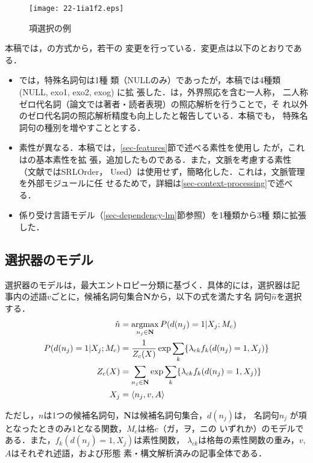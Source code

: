 \documentclass[japanese]{jnlp_1.4}
\begin{document}
\begin{figure}[b]
\begin{center}
\texttt{[image: 22-1ia1f2.eps]}
\end{center}
\caption{項選択の例}
\label{fig-struct}
\end{figure}

本稿では，の方式から，若干の
変更を行っている．変更点は以下のとおりである．

\begin{itemize}
\item {}では，特殊名詞句は1種
類（NULLのみ）であったが，本稿では4種類 (NULL, exo1, exo2, exog) に拡
張した．は，外界照応を含む一人称，
二人称ゼロ代名詞（論文では著者・読者表現）の照応解析を行うことで，そ
れ以外のゼロ代名詞の照応解析精度も向上したと報告している．本稿でも，
特殊名詞句の種別を増やすこととする．
\item 素性が異なる．本稿では，\ref{sec-features}節で述べる素性を使用し
たが，これはの基本素性を拡
張，追加したものである．また，文脈を考慮する素性（文献ではSRLOrder，
Used）は使用せず，簡略化した．これは，文脈管理を外部モジュールに任
せるためで，詳細は\ref{sec-context-processing}で述べる．
\item 係り受け言語モデル（\ref{sec-dependency-lm}節参照）を1種類から3種
類に拡張した．
\end{itemize}


\subsection{選択器のモデル}
\label{sec-selector-models}

選択器のモデルは，最大エントロピー分類に基づく．具体的には，選択器は記
事内の述語$v$ごとに，候補名詞句集合$\textbf{N}$から，以下の式を満たす名
詞句$\hat{n}$を選択する．
\begin{align}
\hat{n} & = \mathop{\rm argmax}_{n_j \in \textbf{N}} P(d(n_j)=1 | X_j; M_c) \\
P(d(n_j)=1|X_j;M_c) & = \frac{1}{Z_{c}(X)} 
\exp \sum_{k} \{ \lambda_{ck} f_k(d(n_j)=1,X_j) \} \\
Z_{c}(X) & = \sum_{n_j \in \textbf{N}} \exp \sum_k \{\lambda_{ck} f_k(d(n_j)=1,X_j) \} 
	\label{eqn-normalizer}\\
X_j & = \langle n_j, v, A \rangle
\end{align}

ただし，$n$は1つの候補名詞句，$\textbf{N}$は候補名詞句集合，$d(n_j)$は，
名詞句$n_j$ が項となったときのみ1となる関数，$M_c$は格$c$（ガ，ヲ，ニの
いずれか）のモデルである．また，$f_k(d(n_j)=1, X_j)$は素性関数，
$\lambda_{ck}$は格毎の素性関数の重み，$v$,$A$はそれぞれ述語，および形態
素・構文解析済みの記事全体である．
\end{document}
